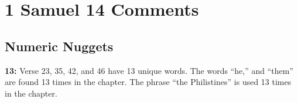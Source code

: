 \section{1 Samuel 14 Comments}

\subsection{Numeric Nuggets}
\textbf{13: } Verse 23, 35, 42, and 46 have 13 unique words.  The words ``he,'' and ``them'' are found 13 times in the chapter. The phrase ``the Philistines'' is used 13 times in the chapter.